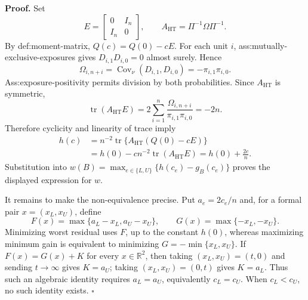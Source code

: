 \textbf{Proof.}
Set
\[
E=\begin{bmatrix}0&I_n\\ I_n&0\end{bmatrix},
\qquad A_{\mathrm{HT}}=\Pi^{-1}\Omega\Pi^{-1}.
\]
By def:moment-matrix, \(Q(c)=Q(0)-cE\).  For each unit \(i\), ass:mutually-exclusive-exposures gives \(D_{i,1}D_{i,0}=0\) almost surely.  Hence
\[
\Omega_{i,n+i}=\operatorname{Cov}_{\nu}(D_{i,1},D_{i,0})
=-\pi_{i,1}\pi_{i,0}.
\]
Ass:exposure-positivity permits division by both probabilities.  Since \(A_{\mathrm{HT}}\) is symmetric,
\[
\operatorname{tr}(A_{\mathrm{HT}}E)
=2\sum_{i=1}^n
\frac{\Omega_{i,n+i}}{\pi_{i,1}\pi_{i,0}}
=-2n.
\]
Therefore cyclicity and linearity of trace imply
\[
\begin{aligned}
h(c)
&=n^{-2}\operatorname{tr}\{A_{\mathrm{HT}}(Q(0)-cE)\}\\
&=h(0)-cn^{-2}\operatorname{tr}(A_{\mathrm{HT}}E)
=h(0)+\frac{2c}{n}.
\end{aligned}
\]
Substitution into \(w(B)=\max_{e\in\{L,U\}}\{h(c_e)-g_B(c_e)\}\) proves the displayed expression for \(w\).

It remains to make the non-equivalence precise.  Put \(a_e=2c_e/n\) and, for a formal pair \(x=(x_L,x_U)\), define
\[
F(x)=\max\{a_L-x_L,a_U-x_U\},
\qquad G(x)=\max\{-x_L,-x_U\}.
\]
Minimizing worst residual uses \(F\), up to the constant \(h(0)\), whereas maximizing minimum gain is equivalent to minimizing \(G=-\min\{x_L,x_U\}\).  If \(F(x)=G(x)+K\) for every \(x\in\mathbb R^2\), then taking \((x_L,x_U)=(t,0)\) and sending \(t\to\infty\) gives \(K=a_U\); taking \((x_L,x_U)=(0,t)\) gives \(K=a_L\).  Thus such an algebraic identity requires \(a_L=a_U\), equivalently \(c_L=c_U\).  When \(c_L<c_U\), no such identity exists. \(\square\)
